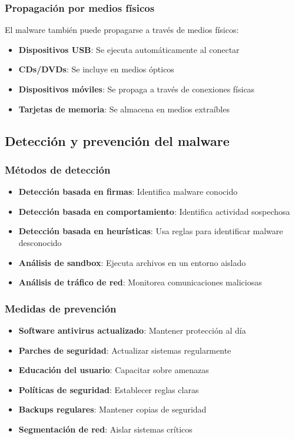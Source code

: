 \subsubsection{Propagación por medios físicos}

El malware también puede propagarse a través de medios físicos:

\begin{itemize}
    \item \textbf{Dispositivos USB}: Se ejecuta automáticamente al conectar
    \item \textbf{CDs/DVDs}: Se incluye en medios ópticos
    \item \textbf{Dispositivos móviles}: Se propaga a través de conexiones físicas
    \item \textbf{Tarjetas de memoria}: Se almacena en medios extraíbles
\end{itemize}

\subsection{Detección y prevención del malware}

\subsubsection{Métodos de detección}

\begin{itemize}
    \item \textbf{Detección basada en firmas}: Identifica malware conocido
    \item \textbf{Detección basada en comportamiento}: Identifica actividad sospechosa
    \item \textbf{Detección basada en heurísticas}: Usa reglas para identificar malware desconocido
    \item \textbf{Análisis de sandbox}: Ejecuta archivos en un entorno aislado
    \item \textbf{Análisis de tráfico de red}: Monitorea comunicaciones maliciosas
\end{itemize}

\subsubsection{Medidas de prevención}

\begin{itemize}
    \item \textbf{Software antivirus actualizado}: Mantener protección al día
    \item \textbf{Parches de seguridad}: Actualizar sistemas regularmente
    \item \textbf{Educación del usuario}: Capacitar sobre amenazas
    \item \textbf{Políticas de seguridad}: Establecer reglas claras
    \item \textbf{Backups regulares}: Mantener copias de seguridad
    \item \textbf{Segmentación de red}: Aislar sistemas críticos
\end{itemize}

